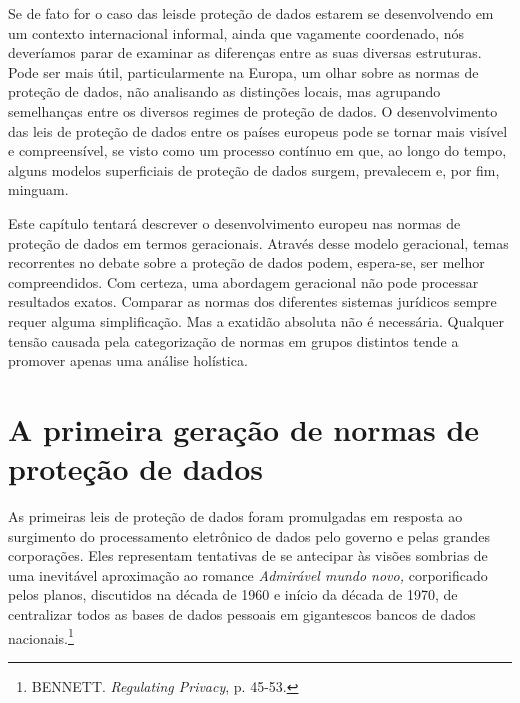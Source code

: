 Se de fato for o caso das leisde proteção de dados estarem se
desenvolvendo em um contexto internacional informal, ainda que vagamente
coordenado, nós deveríamos parar de examinar as diferenças entre as suas
diversas estruturas. Pode ser mais útil, particularmente na Europa, um
olhar sobre as normas de proteção de dados, não analisando as distinções
locais, mas agrupando semelhanças entre os diversos regimes de proteção
de dados. O desenvolvimento das leis de proteção de dados entre os
países europeus pode se tornar mais visível e compreensível, se visto
como um processo contínuo em que, ao longo do tempo, alguns modelos
superficiais de proteção de dados surgem, prevalecem e, por fim,
minguam.

Este capítulo tentará descrever o desenvolvimento europeu nas normas de
proteção de dados em termos geracionais. Através desse modelo
geracional, temas recorrentes no debate sobre a proteção de dados podem,
espera-se, ser melhor compreendidos. Com certeza, uma abordagem
geracional não pode processar resultados exatos. Comparar as normas dos
diferentes sistemas jurídicos sempre requer alguma simplificação. Mas a
exatidão absoluta não é necessária. Qualquer tensão causada pela
categorização de normas em grupos distintos tende a promover apenas uma
análise holística.

\section{A primeira geração de normas de proteção de dados}

As primeiras leis de proteção de dados foram promulgadas em resposta ao
surgimento do processamento eletrônico de dados pelo governo e pelas
grandes corporações. Eles representam tentativas de se antecipar às
visões sombrias de uma inevitável aproximação ao romance \emph{Admirável
mundo novo,} corporificado pelos planos, discutidos na década de 1960 e
início da década de 1970, de centralizar todos as bases de dados
pessoais em gigantescos bancos de dados nacionais.\footnote{BENNETT.
  \emph{Regulating Privacy}, p. 45-53.}

